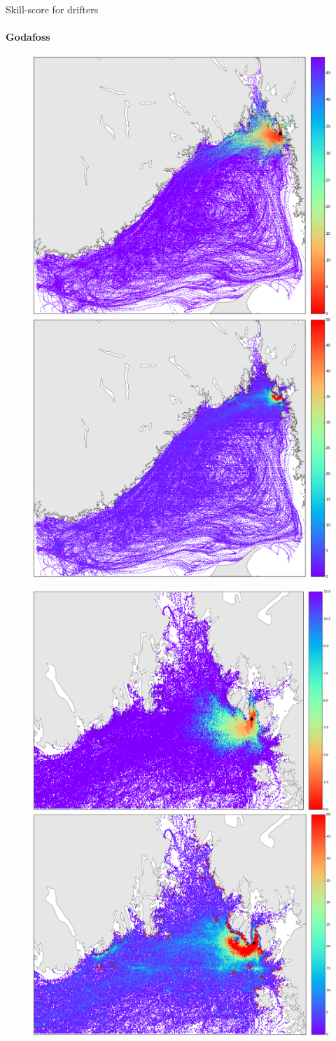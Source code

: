 Skill-score for drifters

\clearpage 
\paragraph{Godafoss}

\begin{figure}[ht]
\centerline{
\includegraphics*[width=.5\textwidth]{Figurer/opendrift/opendrift_godafoss_shortest_time_crop}
\includegraphics*[width=.5\textwidth]{Figurer/opendrift/opendrift_godafoss_consentration_crop}
}
\centerline{
\includegraphics*[width=.5\textwidth]{Figurer/opendrift/opendrift_godafoss_shortest_time_zoom_crop}
\includegraphics*[width=.5\textwidth]{Figurer/opendrift/opendrift_godafoss_consentration_zoom_crop}
}
\end{figure}
